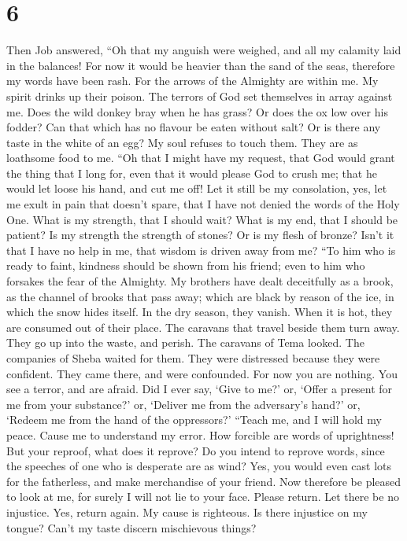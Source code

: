 \hypertarget{section-5}{%
\section{6}\label{section-5}}

 Then Job answered,  ``Oh that my anguish were
weighed, and all my calamity laid in the balances!  For now
it would be heavier than the sand of the seas, therefore my words have
been rash.  For the arrows of the Almighty are within me. My
spirit drinks up their poison. The terrors of God set themselves in
array against me.  Does the wild donkey bray when he has
grass? Or does the ox low over his fodder?  Can that which
has no flavour be eaten without salt? Or is there any taste in the white
of an egg?  My soul refuses to touch them. They are as
loathsome food to me.  ``Oh that I might have my request,
that God would grant the thing that I long for,  even that
it would please God to crush me; that he would let loose his hand, and
cut me off!  Let it still be my consolation, yes, let me
exult in pain that doesn't spare, that I have not denied the words of
the Holy One.  What is my strength, that I should wait?
What is my end, that I should be patient?  Is my strength
the strength of stones? Or is my flesh of bronze?  Isn't it
that I have no help in me, that wisdom is driven away from me?
 ``To him who is ready to faint, kindness should be shown
from his friend; even to him who forsakes the fear of the Almighty.
 My brothers have dealt deceitfully as a brook, as the
channel of brooks that pass away;  which are black by
reason of the ice, in which the snow hides itself.  In the
dry season, they vanish. When it is hot, they are consumed out of their
place.  The caravans that travel beside them turn away.
They go up into the waste, and perish.  The caravans of
Tema looked. The companies of Sheba waited for them.  They
were distressed because they were confident. They came there, and were
confounded.  For now you are nothing. You see a terror, and
are afraid.  Did I ever say, `Give to me?' or, `Offer a
present for me from your substance?'  or, `Deliver me from
the adversary's hand?' or, `Redeem me from the hand of the oppressors?'
 ``Teach me, and I will hold my peace. Cause me to
understand my error.  How forcible are words of
uprightness! But your reproof, what does it reprove?  Do
you intend to reprove words, since the speeches of one who is desperate
are as wind?  Yes, you would even cast lots for the
fatherless, and make merchandise of your friend.  Now
therefore be pleased to look at me, for surely I will not lie to your
face.  Please return. Let there be no injustice. Yes,
return again. My cause is righteous.  Is there injustice on
my tongue? Can't my taste discern mischievous things?


